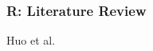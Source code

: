 \documentclass{beamer}
\begin{document}
 \begin{frame}
    \frametitle{R: Literature Review}
    Huo et al. 
    \end{frame}
\end{document}
